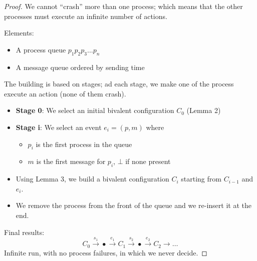 \documentclass[12pt]{article}
\newcommand{\BI}{\begin{itemize}}
\newcommand{\EI}{\end{itemize}}
\begin{document}
\begin{proof}
We cannot ``crash'' more than one process; which means that the other
processes must execute an infinite number of actions.

Elements:
\BI
\item A process queue $p_1 p_2 p_3 \ldots p_n$
\item A message queue ordered by sending time
\EI
The building is based on stages; ad each stage, we make one of the process
execute an action (none of them crash).

\BI
\item {\bf Stage 0}: We select an initial bivalent configuration $C_0$ (Lemma 2)
\item {\bf Stage i}: We select an event $e_i = (p, m)$ where 
  \BI
  \item $p_i$ is the first process in the queue
  \item $m$ is the first message for $p_i$, $\bot$ if none present
  \EI
\item Using Lemma 3, we build a bivalent configuration $C_i$ starting
  from $C_{i-1}$ and $e_i$.
\item We remove the process from the front of the queue and we re-insert
  it at the end.
\EI
Final results:
\[
  C_0 \xrightarrow{s_1} \bullet \xrightarrow{e_1} C_1 \xrightarrow{s_2} \bullet \xrightarrow{e_2} C_2 \rightarrow \ldots
\]
Infinite run, with no process failures, in which we never decide.

\end{proof}



 
\end{document}
